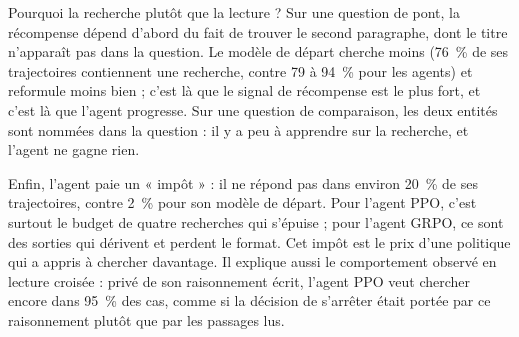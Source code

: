 Pourquoi la recherche plutôt que la lecture ? Sur une question de pont, la récompense dépend d'abord du fait de trouver le second paragraphe, dont le titre n'apparaît pas dans la question. Le modèle de départ cherche moins (76~\% de ses trajectoires contiennent une recherche, contre 79 à 94~\% pour les agents) et reformule moins bien ; c'est là que le signal de récompense est le plus fort, et c'est là que l'agent progresse. Sur une question de comparaison, les deux entités sont nommées dans la question : il y a peu à apprendre sur la recherche, et l'agent ne gagne rien.

Enfin, l'agent paie un « impôt » : il ne répond pas dans environ 20~\% de ses trajectoires, contre 2~\% pour son modèle de départ. Pour l'agent PPO, c'est surtout le budget de quatre recherches qui s'épuise ; pour l'agent GRPO, ce sont des sorties qui dérivent et perdent le format. Cet impôt est le prix d'une politique qui a appris à chercher davantage. Il explique aussi le comportement observé en lecture croisée : privé de son raisonnement écrit, l'agent PPO veut chercher encore dans 95~\% des cas, comme si la décision de s'arrêter était portée par ce raisonnement plutôt que par les passages lus.

